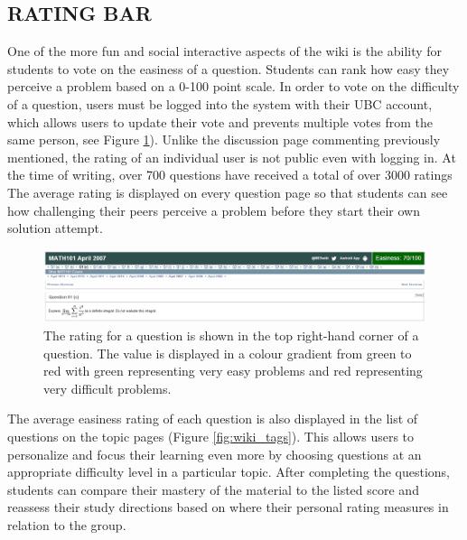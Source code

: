 \documentclass{primus}
\begin{document}
\subsection{RATING BAR}\label{sec:Rating_Bar}
One of the more fun and social interactive aspects of the wiki is the ability for students to vote on the easiness of a question. Students can rank how easy they perceive a problem based on a 0-100 point scale. In order to vote on the difficulty of a question, users must be logged into the system with their UBC account, which allows users to update their vote and prevents multiple votes from the same person, see Figure \ref{fig:Rating_bar}). Unlike the discussion page commenting previously mentioned, the rating of an individual user is not public even with logging in.  At the time of writing, over 700 questions have received a total of over 3000 ratings The average rating is displayed on every question page so that students can see how challenging their peers perceive a problem before they start their own solution attempt.

\begin{figure}[H]
\centering
\includegraphics[width=\textwidth]{figs/easiness_rating.jpg}
\caption{The rating for a question is shown in the top right-hand corner of a question.  The value is displayed in a colour gradient from green to red with green representing very easy problems and red representing very difficult problems.}\label{fig:Rating_bar}
\end{figure}

\noindent{}The average easiness rating of each question is also displayed in the list of questions on the topic pages (Figure \ref{fig:wiki_tags}). This allows users to personalize and focus their learning even more by choosing questions at an appropriate difficulty level in a particular topic.  After completing the questions, students can compare their mastery of the material to the listed score and reassess their study directions based on where their personal rating measures in relation to the group.
\end{document}
